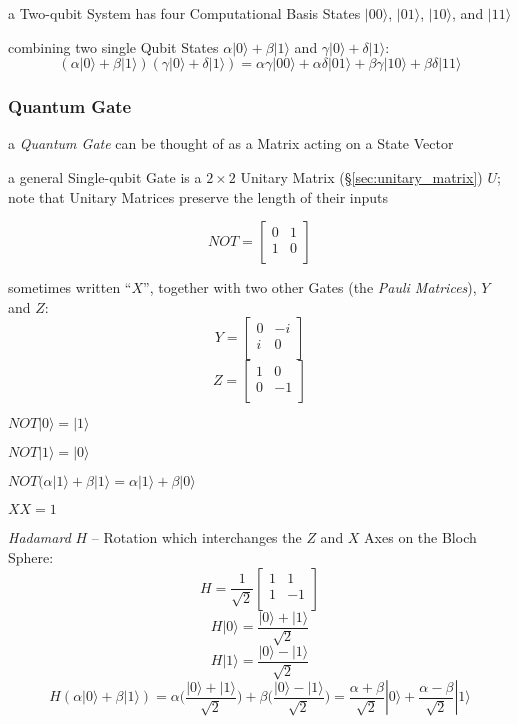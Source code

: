 a Two-qubit System has four Computational Basis States $|00\rangle$,
$|01\rangle$, $|10\rangle$, and $|11\rangle$

combining two single Qubit States $\alpha|0\rangle + \beta|1\rangle$ and
$\gamma|0\rangle + \delta|1\rangle$:
\[
  (\alpha|0\rangle + \beta|1\rangle)(\gamma|0\rangle + \delta|1\rangle) =
    \alpha\gamma|00\rangle + \alpha\delta|01\rangle +
    \beta\gamma|10\rangle + \beta\delta|11\rangle
\]



\subsubsection{Quantum Gate}\label{sec:quantum_gate}

a \emph{Quantum Gate} can be thought of as a Matrix acting on a State Vector

a general Single-qubit Gate is a $2\times2$ Unitary Matrix
(\S\ref{sec:unitary_matrix}) $U$; note that Unitary Matrices preserve the length
of their inputs

\[
NOT =
  \begin{bmatrix}
    0 & 1 \\
    1 & 0 \\
  \end{bmatrix}
\]

sometimes written ``$X$'', together with two other Gates (the \emph{Pauli
  Matrices}), $Y$ and $Z$:
\[
Y =
  \begin{bmatrix}
    0 & -i \\
    i &  0 \\
  \end{bmatrix}
\] \[
Z =
  \begin{bmatrix}
    1 &  0 \\
    0 & -1 \\
  \end{bmatrix}
\]

$NOT|0\rangle = |1\rangle$

$NOT|1\rangle = |0\rangle$

$NOT(\alpha|1\rangle + \beta|1\rangle = \alpha|1\rangle + \beta|0\rangle$

$X X = 1$

\emph{Hadamard} $H$ -- Rotation which interchanges the $Z$ and $X$ Axes on the
Bloch Sphere:
\[
  H = \frac{1}{\sqrt 2}\begin{bmatrix}
    1 &  1 \\
    1 & -1 \\
  \end{bmatrix}
\]
\[
  H|0\rangle = \frac{|0\rangle + |1\rangle}{\sqrt{2}}
\]
\[
  H|1\rangle = \frac{|0\rangle - |1\rangle}{\sqrt{2}}
\]
\[
  H(\alpha|0\rangle + \beta|1\rangle) =
    \alpha\Big(\frac{|0\rangle + |1\rangle}{\sqrt 2}\Big) +
    \beta\Big(\frac{|0\rangle - |1\rangle}{\sqrt 2}\Big)
    = \frac{\alpha + \beta}{\sqrt 2}|0\rangle +
      \frac{\alpha - \beta}{\sqrt 2}|1\rangle
\]

